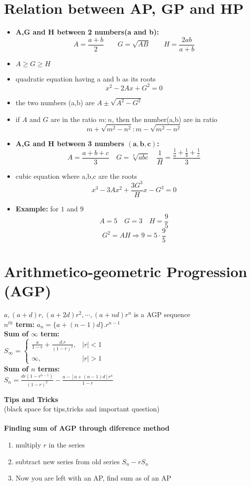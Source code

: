\documentclass[11pt,a4paper,landscape]{article}
\begin{document}
\begin{multicols*}{3}
\section{Relation between AP, GP and HP}
	\begin{itemize}
	\item \textbf{A,G and H between 2 numbers(a and b):}
		$$A =\frac{a+b}{2} \qquad G =\sqrt{AB} \qquad H=\frac{2ab}{a+b}$$
	\item $A\geq G\geq H$
	\item quadratic equation having a and b as its roots
		$$x^2 - 2Ax+G^2=0$$
	\item the two numbers (a,b) are $A\pm \sqrt{A^2 - G^2}$
	\item if $A$ and $G$ are in the ratio $m:n$,
		then the number(a,b) are in ratio$$m+\sqrt{m^2 - n^2} : m-\sqrt{m^2 - n^2}$$
	\item \textbf{A,G and H between 3 numbers $\mathbf{(a, b, c)}$:}
		$$A=\frac{a+b+c}{3} \quad G=\sqrt[3]{abc} \quad \frac{1}{H}=\frac{\frac{1}{a}+\frac{1}{b}+\frac{1}{c}}{3}$$
	\item cubic equation where a,b,c are the roots
		$$x^3-3Ax^2+\frac{3G^3}{H}x-G^3=0$$
	\item \textbf{Example:} for $1$ and $9$
	$$A=5 \quad G=3 \quad H=\frac{9}{5}$$
	$$G^2=AH \Rightarrow 9=5\cdot \frac{9}{5}$$
\end{itemize}
\section{Arithmetico-geometric Progression (AGP)}
	$a,(a+d)r,(a+2d)r^2,\cdots,(a+nd)r^n$ is a AGP sequence\\[4mm]
	\textbf{$n^{th}$ term:} $a_n = \{a+(n-1)d\}.r^{n-1}$\\[4mm]
	\textbf{Sum of  $\infty$ term:}\\[3mm]
		$
		S_{\infty}=
		\begin{cases}
		\frac{a}{1-r}+\frac{d.r}{(1-r)^2}, & |r|<1\\
		\infty, & |r|>1
		\end{cases}		
		$\\[4mm]
	\textbf{Sum of $n$ terms:}\\[3mm]
		$S_n=\frac{dr(1-r^{n-1})}{(1-r)^2}-\frac{a-[a+(n-1)d]r^n}{1-r}$	
	
\vfill\null
\columnbreak
\textbf{\huge{Tips and Tricks}}\\
(black space for tips,tricks and important question)\\ \\
	\textbf{Finding sum of AGP through diference method}
	\begin{enumerate}
	\item multiply $r$ in the series
	\item subtract new series from old series $S_n-rS_n$
	\item Now you are left with an AP, find sum as of an AP
	\end{enumerate}
\end{multicols*}
\end{document}
